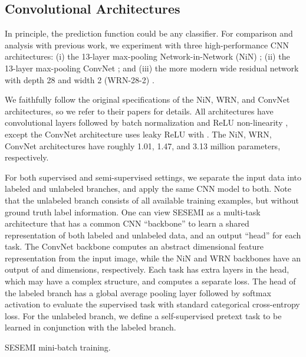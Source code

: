 \documentclass{article}
\begin{document}
\subsection{Convolutional Architectures}
In principle, the prediction function  could be any classifier. For comparison and analysis with previous work, we experiment with three high-performance CNN architectures: (i) the 13-layer max-pooling Network-in-Network (NiN) \cite{rotations}; (ii) the 13-layer max-pooling ConvNet \cite{tempens,mean-teacher,vat2,vadd,sntg}; and (iii) the more modern wide residual network with depth 28 and width 2 (WRN-28-2) \cite{wrn,ssl-eval}.

We faithfully follow the original specifications of the NiN, WRN, and ConvNet architectures, so we refer to their papers for details. All architectures have convolutional layers followed by batch normalization \cite{batchnorm} and ReLU non-linearity \cite{relu}, except the ConvNet architecture uses leaky ReLU \cite{lrelu} with . The NiN, WRN, ConvNet architectures have roughly 1.01, 1.47, and 3.13 million parameters, respectively.

For both supervised and semi-supervised settings, we separate the input data into labeled and unlabeled branches, and apply the same CNN model to both. Note that the unlabeled branch consists of all available training examples, but without ground truth label information. One can view SESEMI as a multi-task architecture that has a common CNN ``backbone'' to learn a shared representation of both labeled and unlabeled data, and an output ``head'' for each task. The ConvNet backbone computes an abstract  dimensional feature representation from the input image, while the NiN and WRN backbones have an output of  and  dimensions, respectively. Each task has extra layers in the head, which may have a complex structure, and computes a separate loss. The head of the labeled branch has a global average pooling layer followed by softmax activation to evaluate the supervised task with standard categorical cross-entropy loss. For the unlabeled branch, we define a self-supervised pretext task to be learned in conjunction with the labeled branch.

\begin{algorithm}[t]
{\caption{SESEMI mini-batch training.}\label{algorithm1}}
\DontPrintSemicolon
\SetAlgoNoLine
{}
\BlankLine
{}
\Return{}
\end{algorithm}
\end{document}
